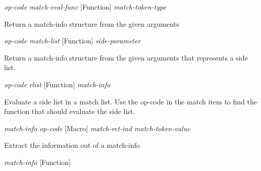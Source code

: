 \vspace{1em}
\noindent
{}
\usebox{\funcname}\emph{op-code} \emph{match-eval-func}
 \hfill [Function]
\hspace*{\wd\funcname}\emph{match-token-type}
\hspace*{\wd\funcname}

\begin{doc-string}
Return a match-info structure from the given arguments
\end{doc-string}

\vspace{1em}
\noindent
{}
\usebox{\funcname}\emph{op-code} \emph{match-list}
 \hfill [Function]
\hspace*{\wd\funcname}\emph{side-parameter}

\begin{doc-string}
Return a match-info structure from the given arguments that represents a
side list.
\end{doc-string}

\vspace{1em}
\noindent
{}
\usebox{\funcname}\emph{op-code} \emph{rlist}
 \hfill [Function]
\hspace*{\wd\funcname}\emph{match-info}

\begin{doc-string}
Evaluate a side list in a match list.  Use the op-code in  the match item to
find the function that should evaluate the side list.
\end{doc-string}

\vspace{1em}
\noindent
{}
\usebox{\funcname}\emph{match-info} \emph{op-code}
 \hfill [Macro]
\hspace*{\wd\funcname}\emph{match-ret-ind}
\hspace*{\wd\funcname}\emph{match-token-value}

\begin{doc-string}
Extract the information out of a match-info
\end{doc-string}

\vspace{1em}
\noindent
{}
\usebox{\funcname}\emph{match-info}
 \hfill [Function]

